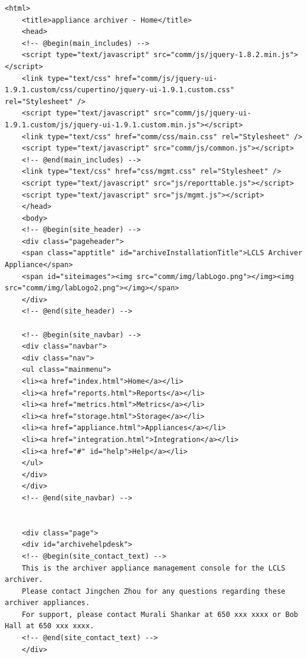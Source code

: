 \documentclass[11pt
  , a4paper
  , article
  , oneside
]{memoir}
\begin{document}
\begin{itemize}
\begin{lstlisting}[style=termstyle]
	<html>
	<title>appliance archiver - Home</title>
	<head>
	<!-- @begin(main_includes) -->
	<script type="text/javascript" src="comm/js/jquery-1.8.2.min.js"></script>
	<link type="text/css" href="comm/js/jquery-ui-1.9.1.custom/css/cupertino/jquery-ui-1.9.1.custom.css" rel="Stylesheet" /> 
	<script type="text/javascript" src="comm/js/jquery-ui-1.9.1.custom/js/jquery-ui-1.9.1.custom.min.js"></script>
	<link type="text/css" href="comm/css/main.css" rel="Stylesheet" /> 
	<script type="text/javascript" src="comm/js/common.js"></script>
	<!-- @end(main_includes) -->
	<link type="text/css" href="css/mgmt.css" rel="Stylesheet" /> 
	<script type="text/javascript" src="js/reporttable.js"></script>
	<script type="text/javascript" src="js/mgmt.js"></script>
	</head>
	<body>
	<!-- @begin(site_header) -->
	<div class="pageheader">
	<span class="apptitle" id="archiveInstallationTitle">LCLS Archiver Appliance</span>
	<span id="siteimages"><img src="comm/img/labLogo.png"></img><img src="comm/img/labLogo2.png"></img></span>
	</div>
	<!-- @end(site_header) -->
	
	<!-- @begin(site_navbar) -->
	<div class="navbar">
	<div class="nav">
	<ul class="mainmenu">
	<li><a href="index.html">Home</a></li>
	<li><a href="reports.html">Reports</a></li>
	<li><a href="metrics.html">Metrics</a></li>
	<li><a href="storage.html">Storage</a></li>
	<li><a href="appliance.html">Appliances</a></li>
	<li><a href="integration.html">Integration</a></li>
	<li><a href="#" id="help">Help</a></li>
	</ul>
	</div>
	</div>
	<!-- @end(site_navbar) -->
	
	
	<div class="page">
	<div id="archivehelpdesk">
	<!-- @begin(site_contact_text) -->
	This is the archiver appliance management console for the LCLS archiver. 
	Please contact Jingchen Zhou for any questions regarding these archiver appliances. 
	For support, please contact Murali Shankar at 650 xxx xxxx or Bob Hall at 650 xxx xxxx. 
	<!-- @end(site_contact_text) -->
	</div>
	

\end{lstlisting}
\end{itemize}
\end{document}

